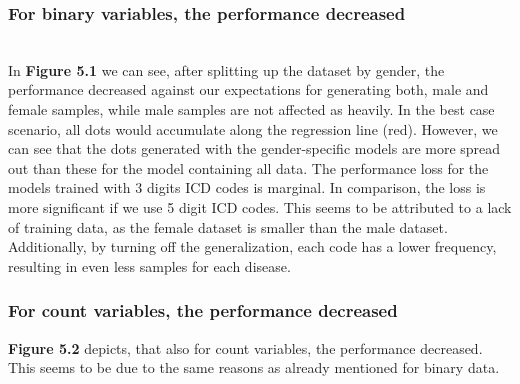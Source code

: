 \documentclass[11pt, a4paper]{book}
\begin{document}
\subsubsection{For binary variables, the performance decreased}
\\
In \textbf{Figure 5.1} we can see, after splitting up the dataset by gender, the performance decreased against our expectations for generating both, male and female samples, while male samples are not affected as heavily. In the best case scenario, all dots would accumulate along the regression line (red). However, we can see that the dots generated with the gender-specific models are more spread out than these for the model containing all data.
 The performance loss for the models trained with 3 digits ICD codes is marginal. In comparison, the loss is more significant if we use 5 digit ICD codes. This seems to be attributed to a lack of training data, as the female dataset is smaller than the male dataset. Additionally, by turning off the generalization, each code has a lower frequency, resulting in even less samples for each disease.
\\
\subsubsection{For count variables, the performance decreased}
\textbf{Figure 5.2} depicts, that also for count variables, the performance decreased. This seems to be due to the same reasons as already mentioned for binary data.
\end{document}
